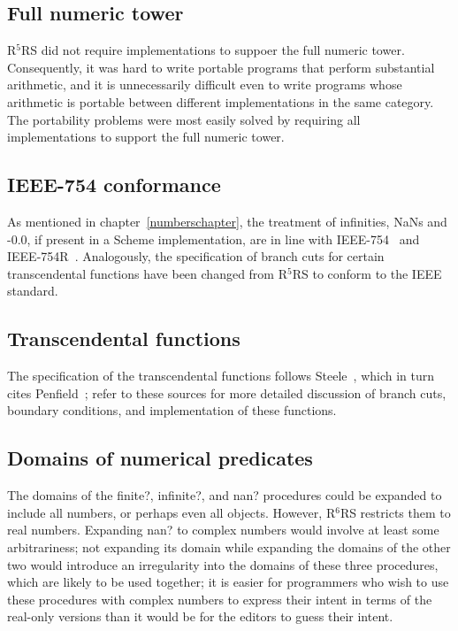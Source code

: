 \documentclass[twoside,twocolumn]{algol60}
\newcommand{\rn}[1]{R$^{#1}$RS}
\begin{document}
\subsection{Full numeric tower}

\rn{5} did not require implementations to suppoer the full numeric
tower.  Consequently, it was hard to write portable programs that
perform substantial arithmetic, and it is unnecessarily difficult even
to write programs whose arithmetic is portable between different
implementations in the same category.  The portability problems were
most easily solved by requiring all implementations to support the
full numeric tower.

\subsection{IEEE-754 conformance}

As mentioned in chapter~\ref{numberschapter}, the treatment of
infinities, NaNs and -0.0, if present in a Scheme implementation, are
in line with IEEE-754~\cite{IEEE} and IEEE-754R~\cite{IEEE754R}.
Analogously, the specification of branch cuts for certain
transcendental functions have been changed from \rn{5} to conform to
the IEEE standard.

\subsection{Transcendental functions}

The specification of the transcendental functions follows
Steele~\cite{CLtL}, which in turn cites Penfield~\cite{Penfield81};
refer to these sources for more detailed discussion of branch cuts,
boundary conditions, and implementation of these functions.

\subsection{Domains of numerical predicates}

The domains of the {\cf finite?}, {\cf infinite?}, and {\cf nan?}
procedures could be expanded to include all numbers, or perhaps even
all objects.  However, \rn{6} restricts them to real numbers.
Expanding {\cf nan?} to complex numbers would involve at least some
arbitrariness; not expanding its domain while expanding the domains of
the other two would introduce an irregularity into the domains of
these three procedures, which are likely to be used together; it is
easier for programmers who wish to use these procedures with complex
numbers to express their intent in terms of the real-only versions
than it would be for the editors to guess their intent.
\end{document}
